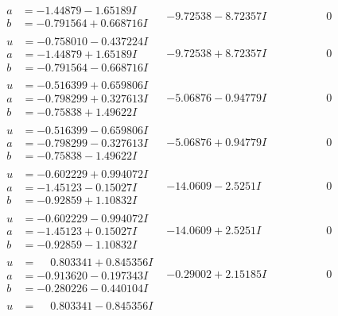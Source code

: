 \documentclass[1p]{elsarticle_modified}
\theoremstyle{definition}
\begin{document}
$$\begin{array}{c|c|c}
\begin{aligned}
a &= -1.44879 - 1.65189 I \\
b &= -0.791564 + 0.668716 I\end{aligned}
 & -9.72538 - 8.72357 I & \phantom{-0.000000 } 0 \\ \hline\begin{aligned}
u &= -0.758010 - 0.437224 I \\
a &= -1.44879 + 1.65189 I \\
b &= -0.791564 - 0.668716 I\end{aligned}
 & -9.72538 + 8.72357 I & \phantom{-0.000000 } 0 \\ \hline\begin{aligned}
u &= -0.516399 + 0.659806 I \\
a &= -0.798299 + 0.327613 I \\
b &= -0.75838 + 1.49622 I\end{aligned}
 & -5.06876 - 0.94779 I & \phantom{-0.000000 } 0 \\ \hline\begin{aligned}
u &= -0.516399 - 0.659806 I \\
a &= -0.798299 - 0.327613 I \\
b &= -0.75838 - 1.49622 I\end{aligned}
 & -5.06876 + 0.94779 I & \phantom{-0.000000 } 0 \\ \hline\begin{aligned}
u &= -0.602229 + 0.994072 I \\
a &= -1.45123 - 0.15027 I \\
b &= -0.92859 + 1.10832 I\end{aligned}
 & -14.0609 - 2.5251 I & \phantom{-0.000000 } 0 \\ \hline\begin{aligned}
u &= -0.602229 - 0.994072 I \\
a &= -1.45123 + 0.15027 I \\
b &= -0.92859 - 1.10832 I\end{aligned}
 & -14.0609 + 2.5251 I & \phantom{-0.000000 } 0 \\ \hline\begin{aligned}
u &= \phantom{-}0.803341 + 0.845356 I \\
a &= -0.913620 - 0.197343 I \\
b &= -0.280226 - 0.440104 I\end{aligned}
 & -0.29002 + 2.15185 I & \phantom{-0.000000 } 0 \\ \hline\begin{aligned}
u &= \phantom{-}0.803341 - 0.845356 I \\

\end{aligned}
\end{array}$$
\end{document}

